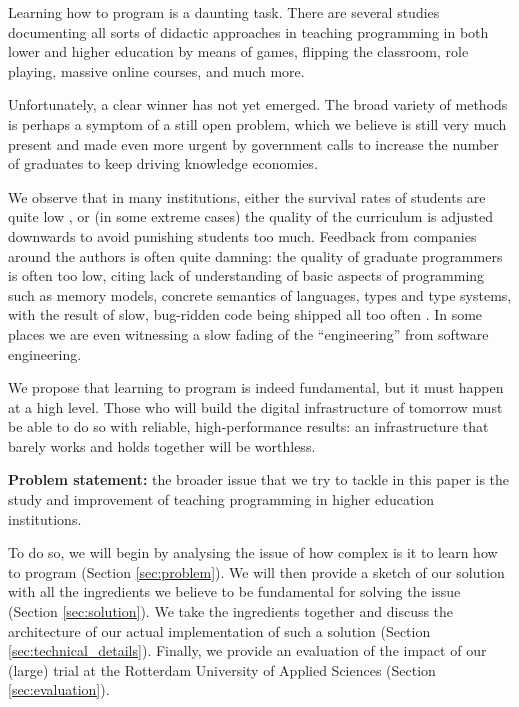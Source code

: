 Learning how to program is a daunting task. There are several studies \cite{fenichel1970program,fincher99,govender2006learning,jenkins2002difficulty,matthiasdottir2006teach,mulholland1998using} documenting all sorts of didactic approaches in teaching programming in both lower and higher education by means of games, flipping the classroom, role playing, massive online courses, and much more.

Unfortunately, a clear winner has not yet emerged. The broad variety of methods is perhaps a symptom of a still open problem, which we believe is still very much present and made even more urgent by government calls to increase the number of graduates \cite{graduates} to keep driving knowledge economies. 

We observe that in many institutions, either the survival rates of students are quite low \cite{bergin2005influence}, or (in some extreme cases) the quality of the curriculum is adjusted downwards to avoid punishing students too much. Feedback from companies around the authors is often quite damning: the quality of graduate programmers is often too low, citing lack of understanding of basic aspects of programming such as memory models, concrete semantics of languages, types and type systems, with the result of slow, bug-ridden code being shipped all too often \cite{pattern_insight,guardian2006}. In some places we are even witnessing a slow fading of the “engineering” from software engineering.

We propose that learning to program is indeed fundamental, but it must happen at a high level. Those who will build the digital infrastructure of tomorrow must be able to do so with reliable, high-performance results: an infrastructure that barely works and holds together will be worthless.

\textbf{Problem statement:} the broader issue that we try to tackle in this paper is the study and improvement of teaching programming in higher education institutions. 

To do so, we will begin by analysing the issue of how complex is it to learn how to program (Section \ref{sec:problem}). We will then provide a sketch of our solution with all the ingredients we believe to be fundamental for solving the issue (Section \ref{sec:solution}). We take the ingredients together and discuss the architecture of our actual implementation of such a solution (Section \ref{sec:technical_details}). Finally, we provide an evaluation of the impact of our (large) trial at the Rotterdam University of Applied Sciences (Section \ref{sec:evaluation}).
